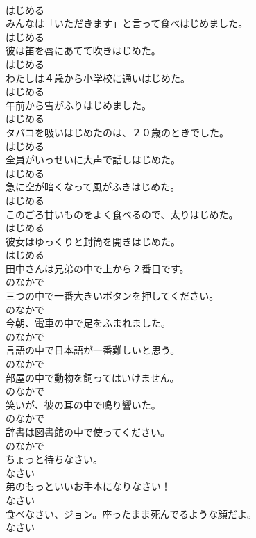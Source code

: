 \documentclass[8pt]{extreport}
\begin{document}
\begin{CJK}{UTF8}{min}
\\	はじめる
\\	みんなは「いただきます」と言って食べはじめました。	
\\	はじめる
\\	彼は笛を唇にあてて吹きはじめた。	
\\	はじめる
\\	わたしは４歳から小学校に通いはじめた。	
\\	はじめる
\\	午前から雪がふりはじめました。	
\\	はじめる
\\	タバコを吸いはじめたのは、２０歳のときでした。	
\\	はじめる
\\	全員がいっせいに大声で話しはじめた。	
\\	はじめる
\\	急に空が暗くなって風がふきはじめた。	
\\	はじめる
\\	このごろ甘いものをよく食べるので、太りはじめた。	
\\	はじめる
\\	彼女はゆっくりと封筒を開きはじめた。	
\\	はじめる
\\	田中さんは兄弟の中で上から２番目です。	
\\	のなかで
\\	三つの中で一番大きいボタンを押してください。	
\\	のなかで
\\	今朝、電車の中で足をふまれました。	
\\	のなかで
\\	言語の中で日本語が一番難しいと思う。	
\\	のなかで
\\	部屋の中で動物を飼ってはいけません。	
\\	のなかで
\\	笑いが、彼の耳の中で鳴り響いた。	
\\	のなかで
\\	辞書は図書館の中で使ってください。	
\\	のなかで
\\	ちょっと待ちなさい。	
\\	なさい
\\	弟のもっといいお手本になりなさい！	
\\	なさい
\\	食べなさい、ジョン。座ったまま死んでるような顔だよ。	
\\	なさい

\end{CJK}
\end{document}
